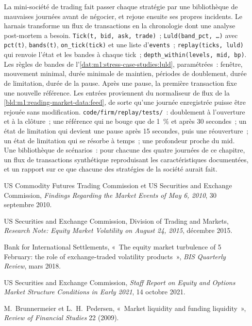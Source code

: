 \begin{build}
 La mini-société de trading fait passer chaque stratégie par une bibliothèque de
mauvaises journées avant de négocier, et rejoue ensuite ses propres incidents. Le harnais
transforme un flux de transactions en la chronologie dont une analyse post-mortem a besoin.
 \texttt{Tick(t, bid, ask, trade)}~; \texttt{Luld(band\_pct,
\ldots)} avec \texttt{pct(t)}, \texttt{bands(t)}, \texttt{on\_tick(tick)} et une
liste d'\texttt{events}~; \texttt{replay(ticks, luld)} qui renvoie l'état et les
bandes à chaque tick~; \texttt{depth\_within(levels, mid, bp)}.
 Les règles de bandes de l'\cref{dat:m1:stress-case-studies:luld}, paramétrées~:
fenêtre, mouvement minimal, durée minimale de maintien, périodes de doublement, durée de
limitation, durée de la pause. Après une pause, la première transaction fixe une nouvelle
référence. Les entrées proviennent du normaliseur de flux de
la \cref{bld:m1:reading-market-data:feed}, de sorte qu'une journée enregistrée puisse être
rejouée sans modification.
 \texttt{code/firm/replay/tests/}~: doublement à l'ouverture et à
la clôture~; une référence qui ne bouge que de 1~\% et après 30 secondes~; un état de
limitation qui devient une pause après 15 secondes, puis une réouverture~; un état de
limitation qui se résorbe à temps~; une profondeur proche du mid.
 Une bibliothèque de scénarios~: pour chacune des quatre
journées de ce chapitre, un flux de transactions synthétique reproduisant les
caractéristiques documentées, et un rapport sur ce que chacune des stratégies de la société aurait fait.
\end{build}

\begin{omsources}
\item US Commodity Futures Trading Commission et US Securities and Exchange
Commission, \emph{Findings Regarding the Market Events of May 6, 2010}, 30
septembre 2010.
\item US Securities and Exchange Commission, Division of Trading and Markets,
\emph{Research Note: Equity Market Volatility on August 24, 2015}, décembre
2015.
\item Bank for International Settlements, «~The equity market turbulence of 5
February: the role of exchange-traded volatility products~», \emph{BIS
Quarterly Review}, mars 2018.
\item US Securities and Exchange Commission, \emph{Staff Report on Equity and
Options Market Structure Conditions in Early 2021}, 14 octobre 2021.
\item M.~Brunnermeier et L.~H.~Pedersen, «~Market liquidity and funding
liquidity~», \emph{Review of Financial Studies} 22 (2009).
\end{omsources}


